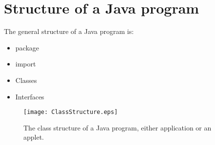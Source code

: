 \section{Structure of a Java program}
The general structure of a Java program is:
\begin{itemize}
\item package
\item import
\item Classes
\item Interfaces
\end{itemize}
\begin{figure}[ht]
  \begin{center}
 \texttt{[image: ClassStructure.eps]}
 \caption{The class structure of a Java program, either application or an applet.}
 \label{fig:ClassStructure}
  \end{center}
\end{figure}

